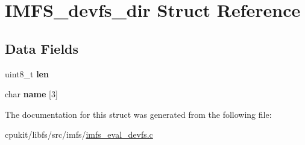 \hypertarget{structIMFS__devfs__dir}{}\section{I\+M\+F\+S\+\_\+devfs\+\_\+dir Struct Reference}
\label{structIMFS__devfs__dir}
\subsection*{Data Fields}
\begin{DoxyCompactItemize}
\item 
\mbox{\label{structIMFS__devfs__dir_a219b4587d59c69fafd1aef4ba252015a}} 
uint8\+\_\+t {\bfseries len}
\item 
\mbox{\label{structIMFS__devfs__dir_abe7e0c898aac8c0a5502f6c003fe1d82}} 
char {\bfseries name} \mbox{[}3\mbox{]}
\end{DoxyCompactItemize}


The documentation for this struct was generated from the following file\+:\begin{DoxyCompactItemize}
\item 
cpukit/libfs/src/imfs/\mbox{\hyperlink{imfs__eval__devfs_8c}{imfs\+\_\+eval\+\_\+devfs.\+c}}\end{DoxyCompactItemize}

